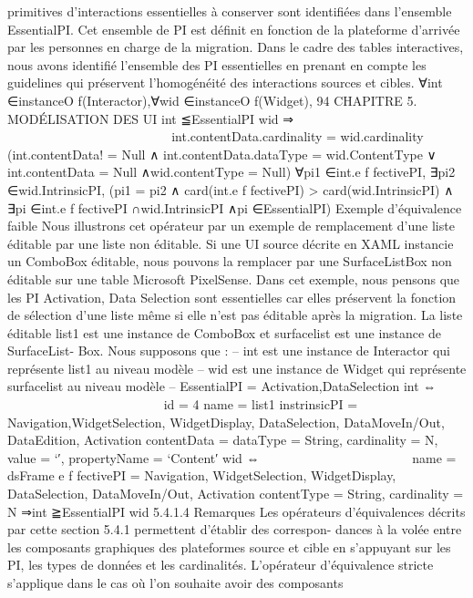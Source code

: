 \documentclass{article}
\begin{document}
primitives d’interactions essentielles à conserver sont identiﬁées dans l’ensemble EssentialPI. Cet
ensemble de PI est déﬁnit en fonction de la plateforme d’arrivée par les personnes en charge de la
migration. Dans le cadre des tables interactives, nous avons identiﬁé l’ensemble des PI essentielles en
prenant en compte les guidelines qui préservent l’homogénéité des interactions sources et cibles.
∀int ∈instanceO f(Interactor),∀wid ∈instanceO f(Widget),
94
CHAPITRE 5. MODÉLISATION DES UI
int ≦EssentialPI wid ⇒











































int.contentData.cardinality = wid.cardinality
(int.contentData! = Null
∧
int.contentData.dataType = wid.ContentType
∨
int.contentData = Null ∧wid.contentType = Null)
∀pi1 ∈int.e f fectivePI,
∃pi2 ∈wid.IntrinsicPI,
(pi1 = pi2
∧
card(int.e f fectivePI) > card(wid.IntrinsicPI)
∧
∃pi ∈int.e f fectivePI ∩wid.IntrinsicPI ∧pi ∈EssentialPI)
Exemple d’équivalence faible
Nous illustrons cet opérateur par un exemple de remplacement d’une
liste éditable par une liste non éditable. Si une UI source décrite en XAML instancie un ComboBox
éditable, nous pouvons la remplacer par une SurfaceListBox non éditable sur une table Microsoft
PixelSense. Dans cet exemple, nous pensons que les PI Activation, Data Selection sont essentielles car
elles préservent la fonction de sélection d’une liste même si elle n’est pas éditable après la migration.
La liste éditable list1 est une instance de ComboBox et surfacelist est une instance de SurfaceList-
Box. Nous supposons que :
– int est une instance de Interactor qui représente list1 au niveau modèle
– wid est une instance de Widget qui représente surfacelist au niveau modèle
– EssentialPI = {Activation,DataSelection}
int ⇔























id = 4
name = list1
instrinsicPI = {Navigation,WidgetSelection,
WidgetDisplay, DataSelection,
DataMoveIn/Out,
DataEdition, Activation}
contentData = {dataType = String, cardinality = N,
value = ‘′, propertyName = ‘Content′}
wid ⇔



















name = dsFrame
e f fectivePI = {Navigation, WidgetSelection,
WidgetDisplay, DataSelection,
DataMoveIn/Out,
Activation}
contentType = String,
cardinality = N
⇒int ≧EssentialPI wid
5.4.1.4
Remarques
Les opérateurs d’équivalences décrits par cette section 5.4.1 permettent d’établir des correspon-
dances à la volée entre les composants graphiques des plateformes source et cible en s’appuyant sur
les PI, les types de données et les cardinalités.
L’opérateur d’équivalence stricte s’applique dans le cas où l’on souhaite avoir des composants
\end{document}
